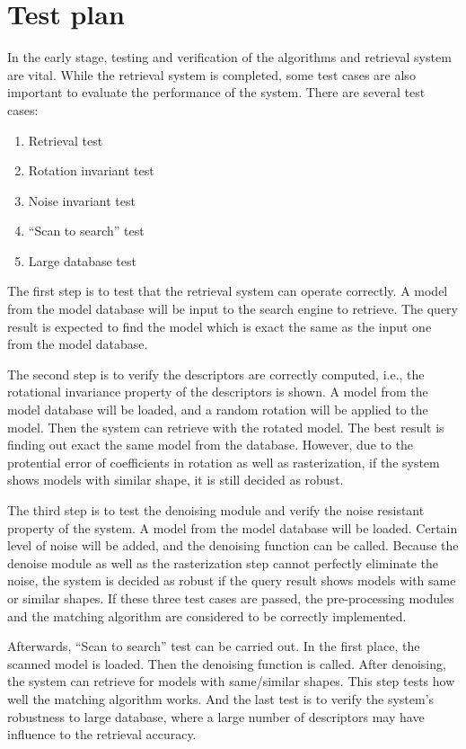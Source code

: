 \section{Test plan} \label{sec:test}

In the early stage, testing and verification of the algorithms and retrieval system are vital. While the retrieval system is completed, some test cases are also important to evaluate the performance of the system. There are several test cases: 

\begin{enumerate}[1)]
\item Retrieval test
\item Rotation invariant test
\item Noise invariant test
\item ``Scan to search'' test
\item Large database test
\end{enumerate}

The first step is to test that the retrieval system can operate correctly. A model from the model database will be input to the search engine to retrieve. The query result is expected to find the model which is exact the same as the input one from the model database. 

The second step is to verify the descriptors are correctly computed, i.e., the rotational invariance property of the descriptors is shown. A model from the model database will be loaded, and a random rotation will be applied to the model. Then the system can retrieve with the rotated model. The best result is finding out exact the same model from the database. However, due to the protential error of coefficients in rotation as well as rasterization, if the system shows models with similar shape, it is still decided as robust. 

The third step is to test the denoising module and verify the noise resistant property of the system. A model from the model database will be loaded. Certain level of noise will be added, and the denoising function can be called. Because the denoise module as well as the rasterization step cannot perfectly eliminate the noise, the system is decided as robust if the query result shows models with same or similar shapes. If these three test cases are passed, the pre-processing modules and the matching algorithm are considered to be correctly implemented. 

Afterwards, ``Scan to search'' test can be carried out. In the first place, the scanned model is loaded. Then the denoising function is called. After denoising, the system can retrieve for models with same/similar shapes. This step tests how well the matching algorithm works. And the last test is to verify the system's robustness to large database, where a large number of descriptors may have influence to the retrieval accuracy. 

